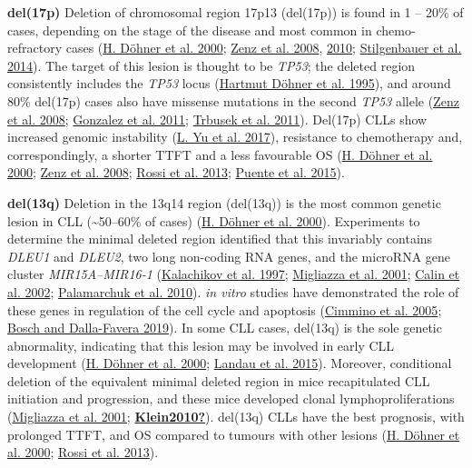 \documentclass[11pt, a4paper, twosided]{book}
\begin{document}
\textbf{del(17p)}
Deletion of chromosomal region 17p13 (del(17p)) is found in 1 -- 20\% of cases, depending on the stage of the disease and most common in chemo-refractory cases (\protect\hyperlink{ref-Dohner2000}{H. Döhner et al. 2000}; \protect\hyperlink{ref-Zenz2008}{Zenz et al. 2008}, \protect\hyperlink{ref-Zenz2010}{2010}; \protect\hyperlink{ref-Stilgenbauer2014}{Stilgenbauer et al. 2014}). The target of this lesion is thought to be \emph{TP53}; the deleted region consistently includes the \emph{TP53} locus (\protect\hyperlink{ref-Dohner1995}{Hartmut Döhner et al. 1995}), and around 80\% del(17p) cases also have missense mutations in the second \emph{TP53} allele (\protect\hyperlink{ref-Zenz2008}{Zenz et al. 2008}; \protect\hyperlink{ref-Gonzalez2011}{Gonzalez et al. 2011}; \protect\hyperlink{ref-Trbusek2011}{Trbusek et al. 2011}). Del(17p) CLLs show increased genomic instability (\protect\hyperlink{ref-Yu2017}{L. Yu et al. 2017}), resistance to chemotherapy and, correspondingly, a shorter TTFT and a less favourable OS (\protect\hyperlink{ref-Dohner2000}{H. Döhner et al. 2000}; \protect\hyperlink{ref-Zenz2008}{Zenz et al. 2008}; \protect\hyperlink{ref-Rossi2013}{Rossi et al. 2013}; \protect\hyperlink{ref-Puente2015}{Puente et al. 2015}).

\textbf{del(13q)}
Deletion in the 13q14 region (del(13q)) is the most common genetic lesion in CLL (\textasciitilde50--60\% of cases) (\protect\hyperlink{ref-Dohner2000}{H. Döhner et al. 2000}). Experiments to determine the minimal deleted region identified that this invariably contains \emph{DLEU1} and \emph{DLEU2}, two long non-coding RNA genes, and the microRNA gene cluster \emph{MIR15A--MIR16-1} (\protect\hyperlink{ref-Kalachikov1997}{Kalachikov et al. 1997}; \protect\hyperlink{ref-Migliazza2001}{Migliazza et al. 2001}; \protect\hyperlink{ref-Calin2002}{Calin et al. 2002}; \protect\hyperlink{ref-Palamarchuk2010}{Palamarchuk et al. 2010}). \emph{in vitro} studies have demonstrated the role of these genes in regulation of the cell cycle and apoptosis (\protect\hyperlink{ref-Cimmino2005}{Cimmino et al. 2005}; \protect\hyperlink{ref-Bosch2019}{Bosch and Dalla-Favera 2019}). In some CLL cases, del(13q) is the sole genetic abnormality, indicating that this lesion may be involved in early CLL development (\protect\hyperlink{ref-Dohner2000}{H. Döhner et al. 2000}; \protect\hyperlink{ref-Landau2015}{Landau et al. 2015}). Moreover, conditional deletion of the equivalent minimal deleted region in mice recapitulated CLL initiation and progression, and these mice developed clonal lymphoproliferations (\protect\hyperlink{ref-Migliazza2001}{Migliazza et al. 2001}; \protect\hyperlink{ref-Klein2010}{\textbf{Klein2010?}}). del(13q) CLLs have the best prognosis, with prolonged TTFT, and OS compared to tumours with other lesions (\protect\hyperlink{ref-Dohner2000}{H. Döhner et al. 2000}; \protect\hyperlink{ref-Rossi2013}{Rossi et al. 2013}).
\end{document}
